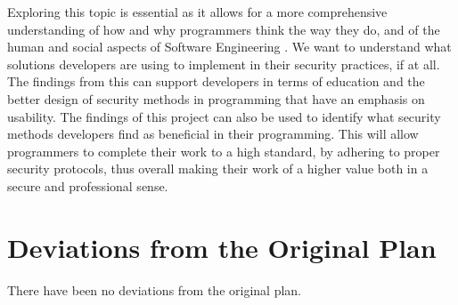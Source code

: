 \newline
\par Exploring this topic is essential as it allows for a more comprehensive understanding of how and why programmers think the way they do, and of the human and social aspects of Software Engineering \cite{geeks}. We want to understand what solutions developers are using to implement in their security practices, if at all. The findings from this can support developers in terms of education and the better design of security methods in programming \cite{summary1} that have an emphasis on usability. The findings of this project can also be used to identify what security methods developers find as beneficial in their programming. This will allow programmers to complete their work to a high standard, by adhering to proper security protocols, thus overall making their work of a higher value both in a secure and professional sense.

\section{Deviations from the Original Plan}
There have been no deviations from the original plan.